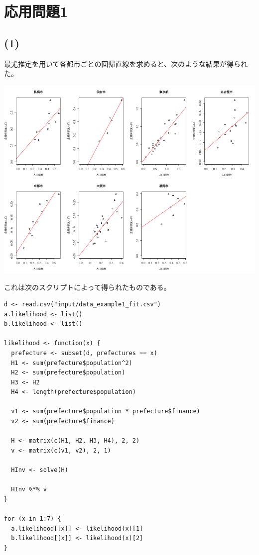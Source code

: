 \documentclass[a4j,xelatex,ja=standard,jafont=hiragino-pron, 9pt]{bxjsarticle}
\let\origfigure=\figure
\let\endorigfigure=\endfigure
\renewenvironment{figure}[1][]{%
  \origfigure[H]
}{%
  \endorigfigure
}
\begin{document}
\section*{応用問題1}

\subsection*{(1)}\label{section}

最尤推定を用いて各都市ごとの回帰直線を求めると、次のような結果が得られた。

\begin{figure}
\centering
\includegraphics[width=14cm]{../src/output/image/regression.png}
\caption{最尤推定法による推定}
\end{figure}

これは次のスクリプトによって得られたものである。

\begin{lstlisting}
d <- read.csv("input/data_example1_fit.csv")
a.likelihood <- list()
b.likelihood <- list()

likelihood <- function(x) {
  prefecture <- subset(d, prefectures == x)
  H1 <- sum(prefecture$population^2)
  H2 <- sum(prefecture$population)
  H3 <- H2
  H4 <- length(prefecture$population)

  v1 <- sum(prefecture$population * prefecture$finance)
  v2 <- sum(prefecture$finance)

  H <- matrix(c(H1, H2, H3, H4), 2, 2)
  v <- matrix(c(v1, v2), 2, 1)

  HInv <- solve(H)

  HInv %*% v
}

for (x in 1:7) {
  a.likelihood[[x]] <- likelihood(x)[1]
  b.likelihood[[x]] <- likelihood(x)[2]
}
\end{lstlisting}
\end{document}
